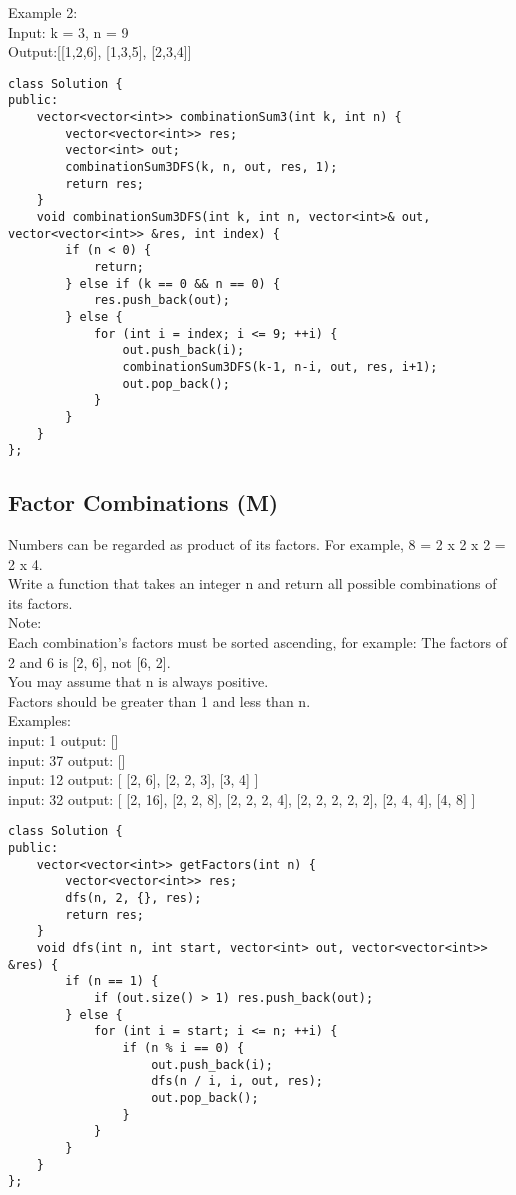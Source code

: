 Example 2:\\
Input: k = 3, n = 9\\
Output:[[1,2,6], [1,3,5], [2,3,4]]\\

\begin{lstlisting}
class Solution {
public:
    vector<vector<int>> combinationSum3(int k, int n) {
        vector<vector<int>> res;
        vector<int> out;
        combinationSum3DFS(k, n, out, res, 1);
        return res;
    }
    void combinationSum3DFS(int k, int n, vector<int>& out, vector<vector<int>> &res, int index) {
        if (n < 0) {
            return;
        } else if (k == 0 && n == 0) {
            res.push_back(out);
        } else {
            for (int i = index; i <= 9; ++i) {
                out.push_back(i);
                combinationSum3DFS(k-1, n-i, out, res, i+1);
                out.pop_back();
            }
        }
    }
};
\end{lstlisting}


\subsection{Factor Combinations (M)}
Numbers can be regarded as product of its factors. For example, 8 = 2 x 2 x 2 = 2 x 4.\\

Write a function that takes an integer n and return all possible combinations of its factors.\\

Note: \\
    Each combination's factors must be sorted ascending, for example: The factors of 2 and 6 is [2, 6], not [6, 2].\\
    You may assume that n is always positive.\\
    Factors should be greater than 1 and less than n.\\

Examples: \\
input: 1
output: 
[]\\

input: 37
output: 
[]\\

input: 12
output:
[
  [2, 6],
  [2, 2, 3],
  [3, 4]
]\\

input: 32
output:
[
  [2, 16],
  [2, 2, 8],
  [2, 2, 2, 4],
  [2, 2, 2, 2, 2],
  [2, 4, 4],
  [4, 8]
]\\

\begin{lstlisting}
class Solution {
public:
    vector<vector<int>> getFactors(int n) {
        vector<vector<int>> res;
        dfs(n, 2, {}, res);
        return res;
    }
    void dfs(int n, int start, vector<int> out, vector<vector<int>> &res) {
        if (n == 1) {
            if (out.size() > 1) res.push_back(out);
        } else {
            for (int i = start; i <= n; ++i) {
                if (n % i == 0) {
                    out.push_back(i);
                    dfs(n / i, i, out, res);
                    out.pop_back();
                }
            }
        }
    }
};
\end{lstlisting}


